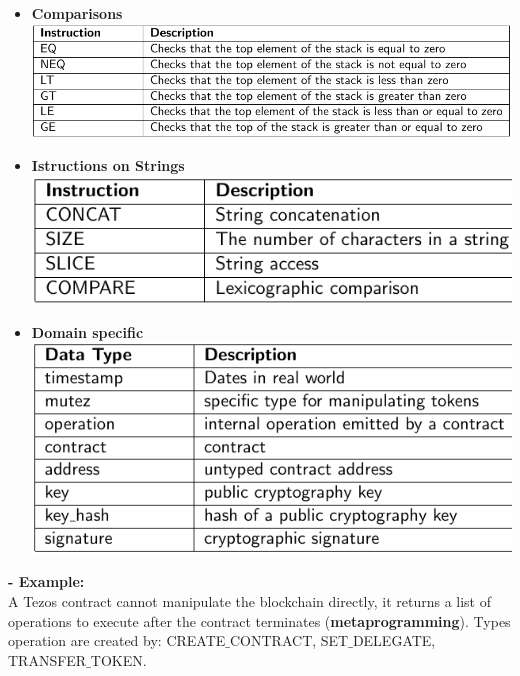 \documentclass{article}
\begin{document}
\begin{itemize}
\item \textbf{Comparisons}\\
\includegraphics[scale=0.4]{75.png}
\item \textbf{Istructions on Strings}\\
\includegraphics[scale=0.4]{76.png}
\item \textbf{Domain specific}\\
\includegraphics[scale=0.4]{77.png}
\end{itemize}
\textbf{- Example:}\\
A Tezos contract cannot manipulate the blockchain directly, it returns a list of operations to execute after the contract terminates (\textbf{metaprogramming}). Types operation are created by: CREATE$\_$CONTRACT, SET$\_$DELEGATE, TRANSFER$\_$TOKEN.
\end{document}
